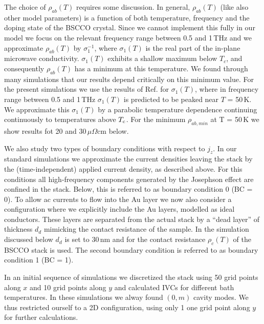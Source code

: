 \documentclass[aps,twocolumn,prb,showpacs,preprintnumbers,superscriptaddress,amsmath,amssymb,longbibliography]{revtex4-1}
\begin{document}
The choice of $\rho_{ab}(T)$ requires some discussion. In general, $\rho_{ab}(T)$ (like also other model parameters) is a function of both temperature, frequency and the doping state of the BSCCO crystal. Since we cannot implement this fully in our model we focus on the relevant frequency range between 0.5 and 1\,THz and we approximate $\rho_{ab}(T)$ by $\sigma_1^{-1}$, where $\sigma_1(T)$ is the real part of the in-plane microwave conductivity. $\sigma_1(T)$ exhibits a shallow maximum below $T_{c}$, and consequently $\rho_{ab}(T)$ has a minimum at this temperature. We found through many simulations that our results depend critically on this minimum value. For the present simulations we use the results of Ref.  for $\sigma_1(T)$, where in frequency range between 0.5 and 1\,THz $\sigma_1(T)$ is predicted to be peaked near $T$ = 50\,K. We approximate this $\sigma_1(T)$ by a parabolic temperature dependence continuing continuously to temperatures above $T_{\rm c}$. For the minimum $\rho_{ab, min}$ at T = 50\,K we show results fot 20 and 30\,$\mu \Omega$cm below. 
 
We also study two types of boundary conditions with respect to $j_z$. In our standard simulations we approximate the current densities leaving the stack by the (time-independent) applied current density, as described above. For this conditions all high-frequency components generated by the Josephson effect are confined in the stack. Below, this is referred to as boundary condition 0 (BC = 0). To allow ac currents to flow into the Au layer we now also consider a configuration where we explicitly include the Au layers, modelled as ideal conductors. These layers are separated from the actual stack by a ``dead layer'' of thickness $d_d$ mimicking the contact resistance of the sample. In the simulation discussed below $d_d$ is set to 30\,nm and for the contact resistance $\rho_c (T)$ of the BSCCO stack is used. The second boundary condition is referred to as boundary condition 1 (BC = 1).

In an initial sequence of simulations we discretized the stack using 50 grid points along $x$ and 10 grid points along $y$ and calculated IVCs for different bath temperatures. In these simulations we alway found $(0,m)$ cavity modes. We thus restricted ourself to a 2D configuration, using only 1 one grid point along $y$ for further calculations. 
\end{document}
